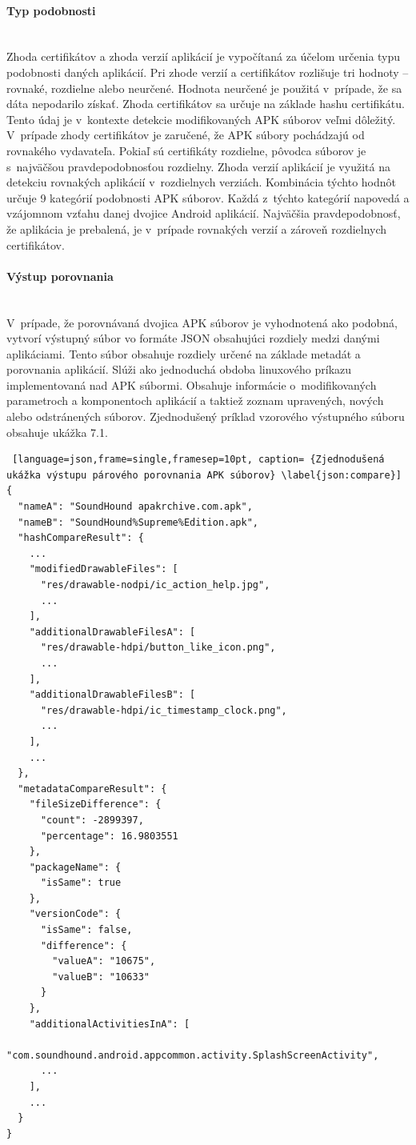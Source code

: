 \paragraph{Typ podobnosti}\mbox{}\\
Zhoda certifikátov a zhoda verzií aplikácií je vypočítaná za účelom určenia typu podobnosti daných aplikácií. Pri zhode verzií a certifikátov rozlišuje tri hodnoty – rovnaké, rozdielne alebo neurčené. Hodnota neurčené je použitá v~prípade, že sa dáta nepodarilo získať. Zhoda certifikátov sa určuje na základe hashu certifikátu. Tento údaj je v~kontexte detekcie modifikovaných APK súborov veľmi dôležitý. V~prípade zhody certifikátov je zaručené, že APK súbory pochádzajú od rovnakého vydavateľa. Pokiaľ sú certifikáty rozdielne, pôvodca súborov je s~najväčšou pravdepodobnosťou rozdielny. Zhoda verzií aplikácií je využitá na detekciu rovnakých aplikácií v~rozdielnych verziách.
Kombinácia týchto hodnôt určuje 9 kategórií podobnosti APK súborov. Každá z~týchto kategórií napovedá a vzájomnom vzťahu danej dvojice Android aplikácií. Najväčšia pravdepodobnosť, že aplikácia je prebalená, je v~prípade rovnakých verzií a zároveň rozdielnych certifikátov. 

\paragraph{Výstup porovnania}\mbox{}\\
V~prípade, že porovnávaná dvojica APK súborov je vyhodnotená ako podobná,  vytvorí výstupný súbor vo formáte JSON obsahujúci rozdiely medzi danými aplikáciami. Tento súbor obsahuje rozdiely určené na základe metadát a porovnania aplikácií. Slúži ako jednoduchá obdoba linuxového príkazu  implementovaná nad APK súbormi. Obsahuje informácie o~modifikovaných parametroch a komponentoch aplikácií a taktiež zoznam upravených, nových alebo odstránených súborov. Zjednodušený príklad vzorového výstupného súboru obsahuje ukážka 7.1.
\begin{lstlisting} [language=json,frame=single,framesep=10pt, caption= {Zjednodušená ukážka výstupu párového porovnania APK súborov} \label{json:compare}]
{
  "nameA": "SoundHound apakrchive.com.apk",
  "nameB": "SoundHound%Supreme%Edition.apk",
  "hashCompareResult": {
    ...
    "modifiedDrawableFiles": [
      "res/drawable-nodpi/ic_action_help.jpg",
      ...
    ],
    "additionalDrawableFilesA": [
      "res/drawable-hdpi/button_like_icon.png",
      ...
    ],
    "additionalDrawableFilesB": [
      "res/drawable-hdpi/ic_timestamp_clock.png",
      ...
    ],
    ...
  },
  "metadataCompareResult": {
    "fileSizeDifference": {
      "count": -2899397,
      "percentage": 16.9803551
    },
    "packageName": {
      "isSame": true
    },
    "versionCode": {
      "isSame": false,
      "difference": {
        "valueA": "10675",
        "valueB": "10633"
      }
    },
    "additionalActivitiesInA": [
      "com.soundhound.android.appcommon.activity.SplashScreenActivity",
      ...
    ],
    ...
  }
}
\end{lstlisting}

